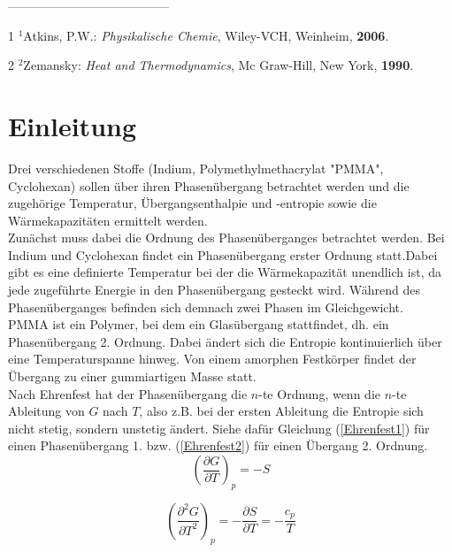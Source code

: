 \documentclass[a4paper,12pt,oneside,onecolum,final,openany]{report}
\begin{document}
\begin{titlepage}
\vspace{1.3cm} 
 ---------------------------------------
\begin{tablenotes}\footnotesize  
\item[1] $^1$Atkins, P.W.: \emph{Physikalische Chemie}, Wiley-VCH, Weinheim, \textbf{2006}.
\item[2] $^2$Zemansky: \emph{Heat and Thermodynamics}, Mc Graw-Hill, New York, \textbf{1990}.
\end{tablenotes}

\end{titlepage}

\tableofcontents %
\newpage

\section{Einleitung}
Drei verschiedenen Stoffe (Indium, Polymethylmethacrylat "PMMA", Cyclohexan) sollen über ihren Phasenübergang betrachtet werden und die zugehörige Temperatur, Übergangsenthalpie und -entropie sowie die Wärmekapazitäten ermittelt werden.\\
Zunächst muss dabei die Ordnung des Phasenüberganges betrachtet werden. Bei Indium und Cyclohexan findet ein Phasenübergang erster Ordnung statt.Dabei gibt es eine definierte Temperatur bei der die Wärmekapazität unendlich ist, da jede zugeführte Energie in den Phasenübergang gesteckt wird. Während des Phasenüberganges befinden sich demnach zwei Phasen im Gleichgewicht.\\
PMMA ist ein Polymer, bei dem ein Glasübergang stattfindet, dh. ein Phasenübergang 2. Ordnung. Dabei ändert sich die Entropie kontinuierlich über eine Temperaturspanne hinweg. Von einem amorphen Festkörper findet der Übergang zu einer gummiartigen Masse statt.\\ 
Nach Ehrenfest hat der Phasenübergang die $n$-te Ordnung, wenn die $n$-te Ableitung von $G$ nach $T$, also z.B. bei der ersten Ableitung die Entropie sich nicht stetig, sondern unstetig ändert. Siehe dafür Gleichung (\ref{Ehrenfest1}) für einen Phasenübergang 1. bzw. (\ref{Ehrenfest2}) für einen Übergang 2. Ordnung.\\ 

\begin{equation} \label{Ehrenfest1}
\left(\frac{\partial G}{\partial T}\right)_p = -S
\end{equation}  
  
\begin{equation} \label{Ehrenfest2}
\left(\frac{\partial^2 G}{\partial T^2}\right)_p = -\frac{\partial S}{\partial T}= - \frac{c_p}{T}
\end{equation}  
\end{document}
